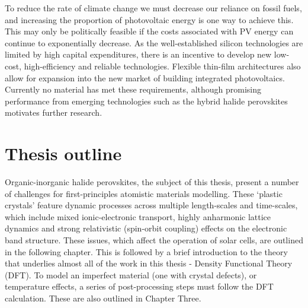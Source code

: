 To reduce the rate of climate change we must decrease our reliance on fossil fuels, and increasing the proportion of photovoltaic energy is one way to achieve this. This may only be politically feasible if the costs associated with PV energy can continue to exponentially decrease. As the well-established silicon technologies are limited by high capital expenditures, there is an incentive to develop new low-cost, high-efficiency and reliable technologies. Flexible thin-film architectures also allow for expansion into the new market of building integrated photovoltaics. Currently no material has met these requirements,\autocite{Zakutayev2017} although promising performance from emerging technologies such as the hybrid halide perovskites motivates further research.




\section{Thesis outline}

Organic-inorganic halide perovskites, the subject of this thesis, present a number of challenges for first-principles atomistic materials modelling. These `plastic crystals' feature dynamic processes across multiple length-scales and time-scales, which include mixed ionic-electronic transport, highly anharmonic lattice dynamics and strong relativistic (spin-orbit coupling) effects on the electronic band structure.
These issues, which affect the operation of solar cells, are outlined in the following chapter. 
This is followed by a brief introduction to the theory that underlies almost all of the work in this thesis - Density Functional Theory (DFT). 
To model an imperfect material (one with crystal defects), or temperature effects, a series of post-processing steps must follow the DFT calculation. These are also outlined in Chapter Three.

